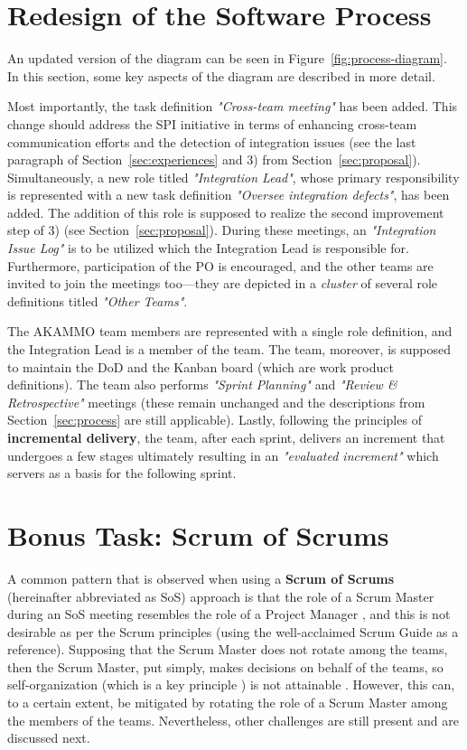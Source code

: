 \documentclass[conference]{IEEEtran}
\begin{document}
\section{Redesign of the Software Process}
\label{sec:redesign}

An updated version of the diagram can be seen in
Figure~\ref{fig:process-diagram}. In this section, some key aspects of the
diagram are described in more detail.

Most importantly, the task definition \textit{"Cross-team meeting"} has been
added. This change should address the SPI initiative in terms of enhancing
cross-team communication efforts and the detection of integration issues (see
the last paragraph of Section~\ref{sec:experiences} and 3) from
Section~\ref{sec:proposal}). Simultaneously, a new role titled
\textit{"Integration Lead"}, whose primary responsibility is represented with a
new task definition \textit{"Oversee integration defects"}, has been added. The
addition of this role is supposed to realize the second improvement step of 3)
(see Section~\ref{sec:proposal}). During these meetings, an
\textit{"Integration Issue Log"} is to be utilized which the Integration Lead
is responsible for. Furthermore, participation of the PO is encouraged, and the
other teams are invited to join the meetings too---they are depicted in a
\textit{cluster} of several role definitions titled \textit{"Other Teams"}.

The \selectfont AKAMMO\rmfamily{} team members are represented
with a single role definition, and the Integration Lead is a member of the team. The
team, moreover, is supposed to maintain the DoD and the Kanban board (which are
work product definitions). The team also performs \textit{"Sprint Planning"} and
\textit{"Review \& Retrospective"} meetings (these remain unchanged and the
descriptions from Section~\ref{sec:process} are still applicable). Lastly,
following the principles of \textbf{incremental delivery}, the team, after each
sprint, delivers an increment that undergoes a few stages ultimately resulting
in an \textit{"evaluated increment"} which servers as a basis for the following
sprint.

\section{Bonus Task: Scrum of Scrums}
\label{sec:bonus_task}

A common pattern that is observed when using a \textbf{Scrum of Scrums}
(hereinafter abbreviated as SoS) approach is that the role of a Scrum Master
during an SoS meeting resembles the role of a Project Manager
\cite{Larman2010}, and this is not desirable as per the Scrum principles (using
the well-acclaimed Scrum Guide \cite{Schwaber2020} as a reference). Supposing
that the Scrum Master does not rotate among the teams, then the Scrum Master,
put simply, makes decisions on behalf of the teams, so self-organization (which
is a key principle \cite{Dikert2016}) is not attainable \cite{Larman2010}.
However, this can, to a certain extent, be mitigated by rotating the role of a
Scrum Master among the members of the teams. Nevertheless, other challenges are
still present and are discussed next.
\end{document}

